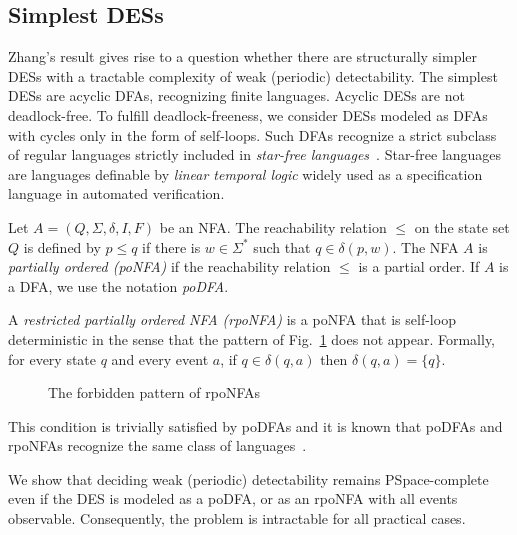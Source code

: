 \documentclass[twocolumn,amsthm]{autartx}
\begin{document}
  
  \subsection{Simplest DESs}
  Zhang's result gives rise to a question whether there are structurally simpler DESs with a tractable complexity of weak (periodic) detectability. The simplest DESs are acyclic DFAs, recognizing finite languages. Acyclic DESs are not deadlock-free. To fulfill deadlock-freeness, we consider DESs modeled as DFAs with cycles only in the form of self-loops. Such DFAs recognize a strict subclass of regular languages strictly included in {\em star-free languages}~\cite{BrzozowskiF80}. Star-free languages are languages definable by {\em linear temporal logic\/} widely used as a specification language in automated verification.

  Let $A=(Q,\Sigma,\delta,I,F)$ be an NFA. The reachability relation $\le$ on the state set $Q$ is defined by $p\le q$ if there is $w\in \Sigma^*$ such that $q\in \delta(p,w)$. The NFA $A$ is {\em partially ordered (poNFA)\/}  if the reachability relation $\le$ is a partial order. If $A$ is a DFA, we use the notation {\em poDFA}.
 
  A \emph{restricted partially ordered NFA (rpoNFA)} is a poNFA that is self-loop deterministic in the sense that the pattern of Fig.~\ref{fig_bad_pattern} does not appear. Formally, for every state $q$ and every event $a$, if $q\in \delta(q,a)$ then $\delta(q,a) = \{q\}$.
  \begin{figure}
    \centering
    \caption{The forbidden pattern of rpoNFAs}
    \label{fig_bad_pattern}
  \end{figure}
  This condition is trivially satisfied by poDFAs and it is known that poDFAs and rpoNFAs recognize the same class of languages~\cite{mfcs16:mktmmt_full}.

  We show that deciding weak (periodic) detectability remains PSpace-complete even if the DES is modeled as a poDFA, or as an rpoNFA with all events observable. Consequently, the problem is intractable for all practical cases.
\end{document}
